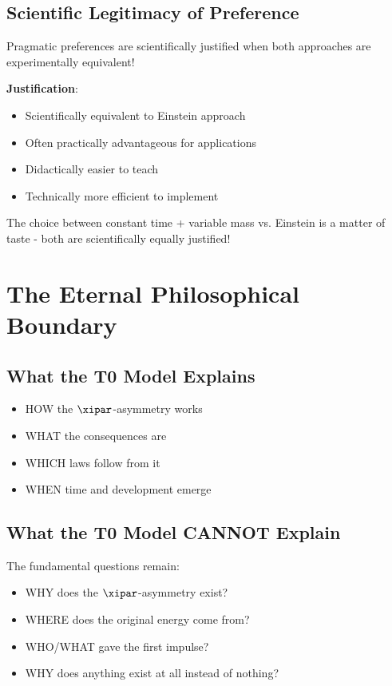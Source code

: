 	\subsection{Scientific Legitimacy of Preference}
	
	\begin{tcolorbox}[colback=green!5!white,colframe=green!75!black,title=Important Insight]
		Pragmatic preferences are scientifically justified when both approaches are experimentally equivalent!
	\end{tcolorbox}
	
	\textbf{Justification}:
	\begin{itemize}
		\item Scientifically equivalent to Einstein approach
		\item Often practically advantageous for applications
		\item Didactically easier to teach
		\item Technically more efficient to implement
	\end{itemize}
	
	The choice between constant time + variable mass vs. Einstein is a matter of taste - both are scientifically equally justified!
	
	\section{The Eternal Philosophical Boundary}
	
	\subsection{What the T0 Model Explains}
	
	\begin{itemize}
		\item HOW the $\xipar$-asymmetry works
		\item WHAT the consequences are
		\item WHICH laws follow from it
		\item WHEN time and development emerge
	\end{itemize}
	
	\subsection{What the T0 Model CANNOT Explain}
	
	The fundamental questions remain:
	\begin{itemize}
		\item WHY does the $\xipar$-asymmetry exist?
		\item WHERE does the original energy come from?
		\item WHO/WHAT gave the first impulse?
		\item WHY does anything exist at all instead of nothing?
	\end{itemize}
	
